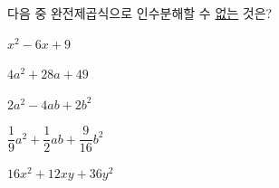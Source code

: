 다음 중 완전제곱식으로 인수분해할 수 \underline{없는} 것은?
\begin{choicesii}{\rule[-3ex]{0pt}{8ex}$x^2-6x+9$}{\rule[-3ex]{0pt}{8ex}$4a^2+28a+49$}{\rule[-3ex]{0pt}{8ex}$2a^2-4ab+2b^2$}{\rule[-3ex]{0pt}{8ex}$\dfrac{1}{9}a^2+\dfrac{1}{2}ab+\dfrac{9}{16}b^2$}{\rule[-3ex]{0pt}{8ex}$16x^2+12xy+36y^2$}\end{choicesii}
